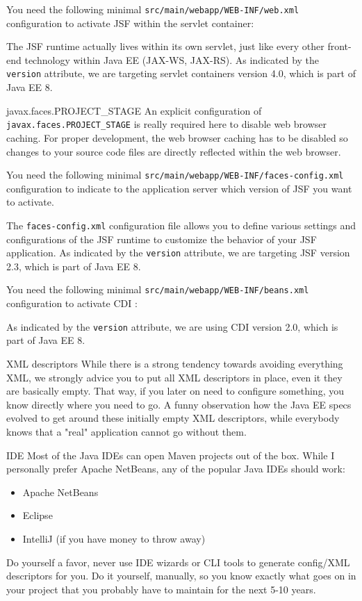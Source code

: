 You need the following minimal \texttt{src/main/webapp/WEB-INF/web.xml} configuration to activate JSF within the servlet container:

The JSF runtime actually lives within its own servlet, just like every other front-end technology within Java EE (JAX-WS, JAX-RS).
As indicated by the \texttt{version} attribute, we are targeting servlet containers version 4.0, which is part of Java EE 8.
\begin{TIP}{javax.faces.PROJECT\_STAGE}
An explicit configuration of \texttt{javax.faces.PROJECT\_STAGE} is really required here to disable web browser caching.
For proper development, the web browser caching has to be disabled so changes to your source code files are directly reflected within the web browser.
\end{TIP}

You need the following minimal \texttt{src/main/webapp/WEB-INF/faces-config.xml} configuration to indicate to the application server which version of JSF you want to activate.

The \texttt{faces-config.xml} configuration file allows you to define various settings and configurations of the JSF runtime to customize the behavior of your JSF application.
As indicated by the \texttt{version} attribute, we are targeting JSF version 2.3, which is part of Java EE 8.

You need the following minimal \texttt{src/main/webapp/WEB-INF/beans.xml} configuration to activate CDI \cite{CDI2}:

As indicated by the \texttt{version} attribute, we are using CDI version 2.0, which is part of Java EE 8.
\begin{TIP}{XML descriptors}
While there is a strong tendency towards avoiding everything XML,
we strongly advice you to put all XML descriptors in place,
even it they are basically empty.
That way, if you later on need to configure something,
you know directly where you need  to go.
A  funny observation how  the Java EE specs evolved to get around these initially empty XML descriptors,
while everybody knows that a  "real" application cannot go without them.
\end{TIP}

\begin{TIP}{IDE}
Most of the Java IDEs can open Maven projects out of the box.
While I personally prefer Apache NetBeans,
any of the popular Java IDEs should work:
\begin{itemize}
	\item Apache NetBeans
	\item Eclipse
	\item IntelliJ (if you have money to throw away)
\end{itemize}
Do yourself a favor,
never use IDE wizards or CLI tools to generate config/XML descriptors for you.
Do it yourself, manually, so you know exactly what goes on in your project that you probably have to maintain for the next 5-10 years.
\end{TIP}

